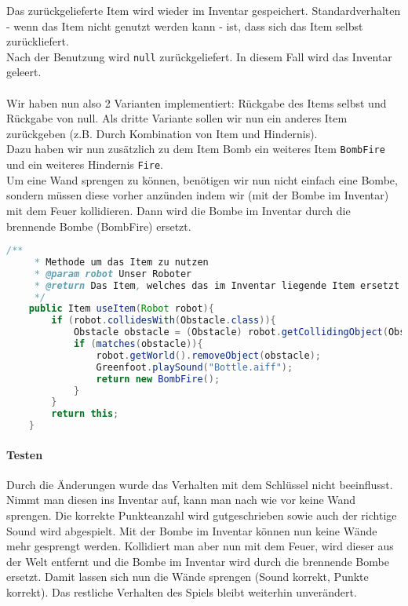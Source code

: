 \documentclass{pi1}
\begin{document}
Das zurückgelieferte Item wird wieder im Inventar gespeichert. Standardverhalten - wenn das Item nicht genutzt werden kann - ist, dass sich das Item selbst zurückliefert.\\
Nach der Benutzung wird \texttt{null} zurückgeliefert. In diesem Fall wird das Inventar geleert.\\
\\
Wir haben nun also 2 Varianten implementiert: Rückgabe des Items selbst und Rückgabe von null. Als dritte Variante sollen wir nun ein anderes Item zurückgeben (z.B. Durch Kombination von Item und Hindernis).\\
Dazu haben wir nun zusätzlich zu dem Item Bomb ein weiteres Item \texttt{BombFire} und ein weiteres Hindernis \texttt{Fire}.\\
Um eine Wand sprengen zu können, benötigen wir nun nicht einfach eine Bombe, sondern müssen diese vorher anzünden indem wir (mit der Bombe im Inventar) mit dem Feuer kollidieren. Dann wird die Bombe im Inventar durch die brennende Bombe (BombFire) ersetzt.

\begin{lstlisting}[caption={Klasse \emph{Bomb}, Methode \emph{useItem()}},firstnumber=11, language=Java]
/**
     * Methode um das Item zu nutzen
     * @param robot Unser Roboter
     * @return Das Item, welches das im Inventar liegende Item ersetzt
     */
    public Item useItem(Robot robot){
        if (robot.collidesWith(Obstacle.class)){
            Obstacle obstacle = (Obstacle) robot.getCollidingObject(Obstacle.class);
            if (matches(obstacle)){
                robot.getWorld().removeObject(obstacle);
                Greenfoot.playSound("Bottle.aiff");
                return new BombFire();
            }
        }
        return this;
    }
\end{lstlisting}

\paragraph{Testen} Durch die Änderungen wurde das Verhalten mit dem Schlüssel nicht beeinflusst. Nimmt man diesen ins Inventar auf, kann man nach wie vor keine Wand sprengen. Die korrekte Punkteanzahl wird gutgeschrieben sowie auch der richtige Sound wird abgespielt. Mit der Bombe im Inventar können nun keine Wände mehr gesprengt werden. Kollidiert man aber nun mit dem Feuer, wird dieser aus der Welt entfernt und die Bombe im Inventar wird durch die brennende Bombe ersetzt. Damit lassen sich nun die Wände sprengen (Sound korrekt, Punkte korrekt). Das restliche Verhalten des Spiels bleibt weiterhin unverändert.
\end{document}

